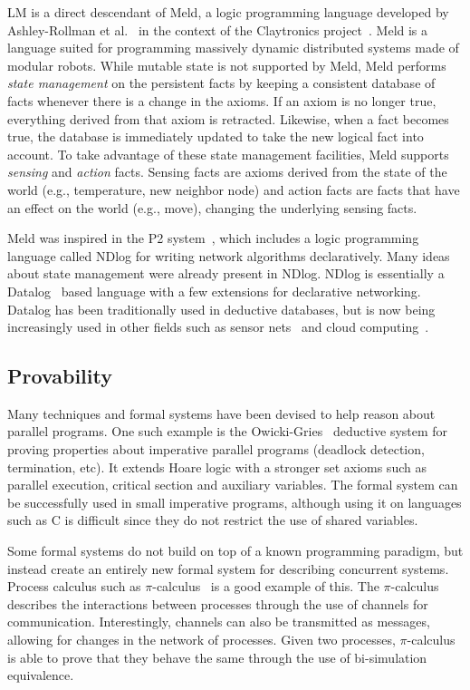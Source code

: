 LM is a direct descendant of Meld, a logic programming language developed by
Ashley-Rollman et
al.~\cite{ashley-rollman-iclp09,ashley-rollman-derosa-iros07wksp} in the context
of the Claytronics project~\cite{goldstein-computer05}. Meld is a language
suited for programming massively dynamic distributed systems made of modular
robots. While mutable state is not supported by Meld, Meld performs \emph{state
management} on the persistent facts by keeping a consistent database of facts
whenever there is a change in the axioms. If an axiom is no longer true,
everything derived from that axiom is retracted. Likewise, when a fact becomes
true, the database is immediately updated to take the new logical fact into
account. To take advantage of these state management facilities, Meld supports
\emph{sensing} and \emph{action} facts. Sensing facts are axioms derived from
the state of the world (e.g., temperature, new neighbor node) and action facts
are facts that have an effect on the world (e.g., move), changing the underlying
sensing facts.

Meld was inspired in the P2 system~\cite{Loo-condie-garofalakis-p2}, which
includes a logic programming language called NDlog for writing network
algorithms declaratively. Many ideas about state management were already present
in NDlog.  NDlog is essentially a Datalog~\cite{Ullman:1990:PDK:533142} based
language with a few extensions for declarative networking. Datalog has been
traditionally used in deductive databases, but is now being increasingly used in
other fields such as sensor nets~\cite{Chu:2007:DID:1322263.1322281} and cloud
computing~\cite{alvaro:boom}.

\subsection{Provability}

Many techniques and formal systems have been devised to help reason about
parallel programs.  One such example is the
Owicki-Gries~\cite{Owicki:1976:VPP:360051.360224} deductive system for proving
properties about imperative parallel programs (deadlock detection, termination,
etc). It extends Hoare logic with a stronger set axioms such as parallel
execution, critical section and auxiliary variables. The formal system can be
successfully used in small imperative programs, although using it on languages
such as C is difficult since they do not restrict the use of shared variables.

Some formal systems do not build on top of a known programming paradigm, but
instead create an entirely new formal system for describing concurrent systems.
Process calculus such as $\pi$-calculus~\cite{Milner:1999:CMS:329902} is a good
example of this.  The $\pi$-calculus describes the interactions between
processes through the use of channels for communication. Interestingly, channels
can also be transmitted as messages, allowing for changes in the network of
processes.  Given two processes, $\pi$-calculus is able to prove that they
behave the same through the use of bi-simulation equivalence.

